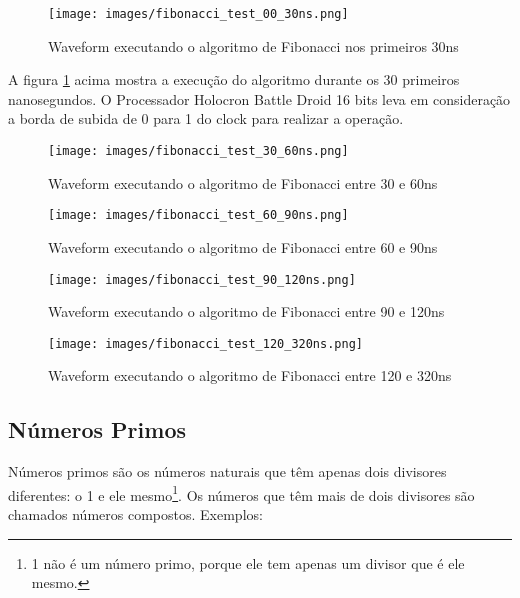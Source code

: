 \documentclass{article}
\newcommand\tab[1][0.50cm]{\hspace*{#1}}
\begin{document}
				\begin{figure}[H]
					\centering
					\caption[Waveform Fibonacci 30ns]{Waveform executando o algoritmo de Fibonacci nos primeiros 30ns}
					\label{fig:Fibonacci_test_00_30ns}
					\texttt{[image: images/fibonacci\_test\_00\_30ns.png]}
				\end{figure}
			
				A figura \ref{fig:Fibonacci_test_00_30ns} acima mostra a execu\c{c}\~{a}o do algoritmo durante os 30 primeiros nanosegundos. O Processador Holocron Battle Droid 16 bits leva em considera\c{c}\~{a}o a borda de subida de 0 para 1 do clock para realizar a opera\c{c}\~{a}o.
			
				\begin{figure}[H]
					\centering
					\caption[Waveform Fibonacci 60ns]{Waveform executando o algoritmo de Fibonacci entre 30 e 60ns}
					\label{fig:Fibonacci_test_30_60ns}
					\texttt{[image: images/fibonacci\_test\_30\_60ns.png]}
				\end{figure}
			
				\begin{figure}[H]
					\centering
					\caption[Waveform Fibonacci 90ns]{Waveform executando o algoritmo de Fibonacci entre 60 e 90ns}
					\label{fig:Fibonacci_test_60_90ns}
					\texttt{[image: images/fibonacci\_test\_60\_90ns.png]}
				\end{figure}
			
				\begin{figure}[H]
					\centering
					\caption[Waveform Fibonacci 120ns]{Waveform executando o algoritmo de Fibonacci entre 90 e 120ns}
					\label{fig:Fibonacci_test_90_120ns}
					\texttt{[image: images/fibonacci\_test\_90\_120ns.png]}
				\end{figure}
			
				\begin{figure}[H]
					\centering
					\caption[Waveform Fibonacci 320ns]{Waveform executando o algoritmo de Fibonacci entre 120 e 320ns}
					\label{fig:Fibonacci_test_120_320ns}
					\texttt{[image: images/fibonacci\_test\_120\_320ns.png]}
				\end{figure}
			
		\subsection[N\'umeros primos]{N\'umeros Primos}
		
			\tab N\'umeros primos s\~ao os n\'umeros naturais que t\^em apenas dois divisores diferentes: o 1 e ele mesmo\footnote{1 n\~ao \'e um n\'umero primo, porque ele tem apenas um divisor que \'e ele mesmo.}. Os n\'umeros que t\^em mais de dois divisores s\~ao chamados n\'umeros compostos.  Exemplos:
			
\end{document}

